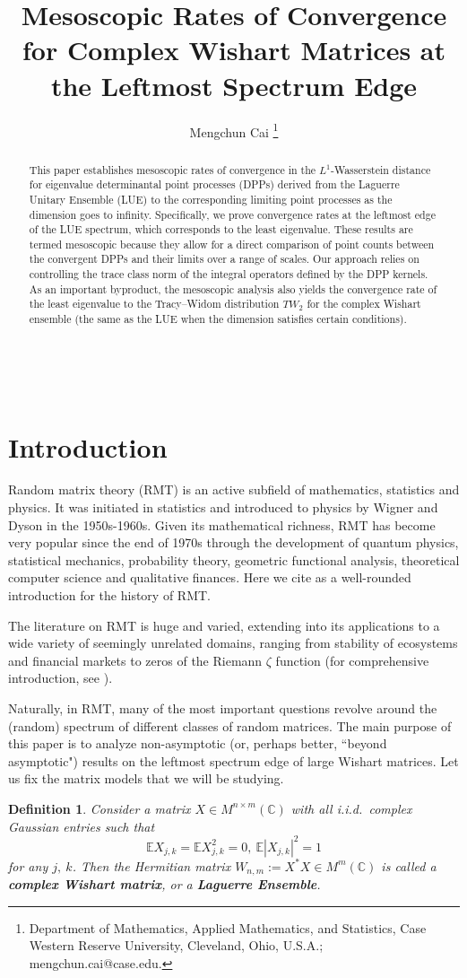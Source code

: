 \documentclass[11pt]{article}
\title{Mesoscopic Rates of Convergence for Complex Wishart Matrices at the Leftmost Spectrum Edge}
\date{}
\author{Mengchun Cai%
\thanks{Department of Mathematics, Applied Mathematics, and
  Statistics, Case Western Reserve University, Cleveland, Ohio,
  U.S.A.; mengchun.cai@case.edu.}}
\newtheorem{definition}[theorem]{Definition}
\numberwithin{equation}{section}%
\numberwithin{theorem}{section}
\begin{document}
\maketitle
\begin{abstract}
\noindent This paper establishes mesoscopic rates of convergence in the $L^1$-Wasserstein distance for eigenvalue determinantal point processes (DPPs) derived from the Laguerre Unitary Ensemble (LUE) to the corresponding limiting point processes as the dimension goes to infinity. Specifically, we prove convergence rates at the leftmost edge of the LUE spectrum, which corresponds to the least eigenvalue. These results are termed mesoscopic because they allow for a direct comparison of point counts between the convergent DPPs and their limits over a range of scales. Our approach relies on controlling the trace class norm of the integral operators defined by the DPP kernels. As an important byproduct, the mesoscopic analysis also yields the convergence rate of the least eigenvalue to the Tracy–Widom distribution $TW_2$ for the complex Wishart ensemble (the same as the LUE when the dimension satisfies certain conditions).
\end{abstract}
\
\section{Introduction}
Random matrix theory (RMT) is an active subfield of mathematics, statistics and physics. It was initiated in statistics and introduced to physics by Wigner and Dyson in the 1950s-1960s. Given its mathematical richness, RMT has become very popular since the end of 1970s through the development of quantum physics, statistical mechanics, probability theory, geometric functional analysis,  theoretical computer science and qualitative finances. Here we cite \cite{forrester_developments_2003} as a well-rounded introduction for the history of RMT.

The literature on RMT is huge and varied, extending into its applications to a wide variety of seemingly unrelated domains, ranging from stability of ecosystems and financial markets to zeros of the Riemann $\zeta$ function (for comprehensive introduction, see \cite{akemann_oxford_2015,anderson2010introduction,mehta_random_2004,pastour_eigenvalue_2011,potters_first_2020}).

Naturally, in RMT, many of the most important questions revolve around the (random) spectrum of different classes of random matrices. The main purpose of this paper is to analyze non-asymptotic (or, perhaps better, ``beyond asymptotic") results on the leftmost spectrum edge of large Wishart matrices. Let us fix the matrix models that we will be studying.
\begin{definition}
  Consider a matrix $X\in M^{n\times m}(\mathbb{C})$ with all i.i.d.\ complex Gaussian entries such that
    \begin{equation*}
        \mathbb{E} X_{j,k}=\mathbb{E}X_{j,k}^2=0,~\mathbb{E}|X_{j,k}|^2=1
    \end{equation*}
    for any $j,~k$. Then the Hermitian matrix $W_{n,m}:=X^*X\in M^{m}(\mathbb{C})$ is called a \textbf{complex Wishart matrix}, or a \textbf{Laguerre Ensemble}.
\end{definition}
\end{document}
